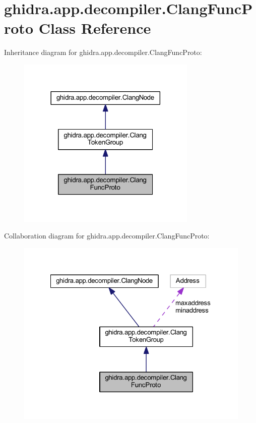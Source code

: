 \hypertarget{classghidra_1_1app_1_1decompiler_1_1_clang_func_proto}{}\section{ghidra.\+app.\+decompiler.\+Clang\+Func\+Proto Class Reference}
\label{classghidra_1_1app_1_1decompiler_1_1_clang_func_proto}


Inheritance diagram for ghidra.\+app.\+decompiler.\+Clang\+Func\+Proto\+:
\nopagebreak
\begin{figure}[H]
\begin{center}
\leavevmode
\includegraphics[width=242pt]{classghidra_1_1app_1_1decompiler_1_1_clang_func_proto__inherit__graph}
\end{center}
\end{figure}


Collaboration diagram for ghidra.\+app.\+decompiler.\+Clang\+Func\+Proto\+:
\nopagebreak
\begin{figure}[H]
\begin{center}
\leavevmode
\includegraphics[width=322pt]{classghidra_1_1app_1_1decompiler_1_1_clang_func_proto__coll__graph}
\end{center}
\end{figure}
